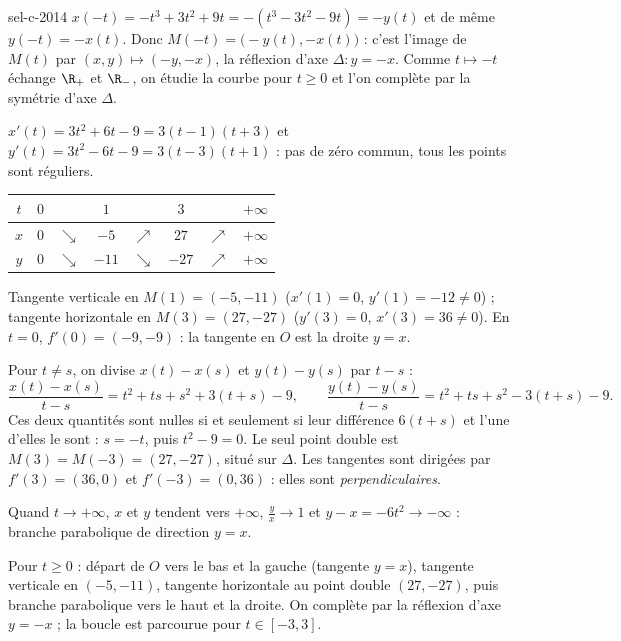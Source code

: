 \begin{corrige}{sel-c-2014}
 $x(-t)=-t^3+3t^2+9t=-(t^3-3t^2-9t)=-y(t)$ et de même $y(-t)=-x(t)$. Donc $M(-t)=\big(-y(t),-x(t)\big)$ : c'est l'image de $M(t)$ par $(x,y)\mapsto(-y,-x)$, la réflexion d'axe $\Delta:y=-x$. Comme $t\mapsto-t$ échange $\R_+$ et $\R_-$, on étudie la courbe pour $t\geq0$ et l'on complète par la symétrie d'axe $\Delta$.

 $x'(t)=3t^2+6t-9=3(t-1)(t+3)$ et $y'(t)=3t^2-6t-9=3(t-3)(t+1)$ : pas de zéro commun, tous les points sont réguliers.
\begin{center}
\renewcommand{\arraystretch}{1.25}
\begin{tabular}{c|ccccccc}
$t$ & $0$ & & $1$ & & $3$ & & $+\infty$\\\hline
$x$ & $0$ & $\searrow$ & $-5$ & $\nearrow$ & $27$ & $\nearrow$ & $+\infty$\\
$y$ & $0$ & $\searrow$ & $-11$ & $\searrow$ & $-27$ & $\nearrow$ & $+\infty$
\end{tabular}
\end{center}
Tangente verticale en $M(1)=(-5,-11)$ ($x'(1)=0$, $y'(1)=-12\neq0$) ; tangente horizontale en $M(3)=(27,-27)$ ($y'(3)=0$, $x'(3)=36\neq0$). En $t=0$, $f'(0)=(-9,-9)$ : la tangente en $O$ est la droite $y=x$.

 Pour $t\neq s$, on divise $x(t)-x(s)$ et $y(t)-y(s)$ par $t-s$ :
\[\frac{x(t)-x(s)}{t-s}=t^2+ts+s^2+3(t+s)-9,\qquad\frac{y(t)-y(s)}{t-s}=t^2+ts+s^2-3(t+s)-9.\]
Ces deux quantités sont nulles si et seulement si leur différence $6(t+s)$ et l'une d'elles le sont : $s=-t$, puis $t^2-9=0$. Le seul point double est $M(3)=M(-3)=(27,-27)$, situé sur $\Delta$. Les tangentes sont dirigées par $f'(3)=(36,0)$ et $f'(-3)=(0,36)$ : elles sont \emph{perpendiculaires}.

 Quand $t\to+\infty$, $x$ et $y$ tendent vers $+\infty$, $\frac yx\to1$ et $y-x=-6t^2\to-\infty$ : branche parabolique de direction $y=x$.

 Pour $t\geq0$ : départ de $O$ vers le bas et la gauche (tangente $y=x$), tangente verticale en $(-5,-11)$, tangente horizontale au point double $(27,-27)$, puis branche parabolique vers le haut et la droite. On complète par la réflexion d'axe $y=-x$ ; la boucle est parcourue pour $t\in[-3,3]$.


\end{corrige}
